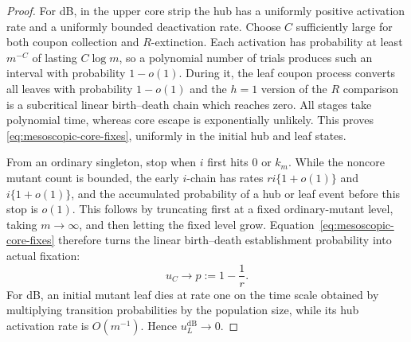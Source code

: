 \documentclass[11pt]{article}
\theoremstyle{definition}
\theoremstyle{remark}
\newcommand{\dB}{\mathrm{dB}}
\begin{document}
\begin{proof}
For dB, in the upper core strip the hub has a uniformly positive activation
rate and a uniformly bounded deactivation rate.  Choose $C$ sufficiently
large for both coupon collection and $R$-extinction.  Each activation has
probability at least $m^{-C}$ of lasting $C\log m$, so a polynomial number
of trials produces such an interval with probability $1-o(1)$.  During it,
the leaf coupon process converts all leaves with probability $1-o(1)$ and
the $h=1$ version of the $R$ comparison is a subcritical linear
birth--death chain which reaches zero.  All stages take polynomial time,
whereas core escape is exponentially unlikely.  This proves
\eqref{eq:mesoscopic-core-fixes}, uniformly in the initial hub and leaf
states.

From an ordinary singleton, stop when $i$ first hits $0$ or $k_m$.  While
the noncore mutant count is bounded, the early $i$-chain has rates
$ri\{1+o(1)\}$ and $i\{1+o(1)\}$, and the accumulated probability of a hub
or leaf event before this stop is $o(1)$.  This follows by truncating first
at a fixed ordinary-mutant level, taking $m\to\infty$, and then letting the
fixed level grow.  Equation~\eqref{eq:mesoscopic-core-fixes} therefore turns
the linear birth--death establishment probability into actual fixation:
\begin{equation}
             u_C\longrightarrow p:=1-\frac1r.
 \label{eq:pendant-core-singleton}
\end{equation}
For dB, an initial mutant leaf dies at rate one on the time scale obtained by
multiplying transition probabilities by the population size, while its hub
activation rate is $O(m^{-1})$.  Hence $u_L^{\dB}\to0$.


\end{proof}
\end{document}
